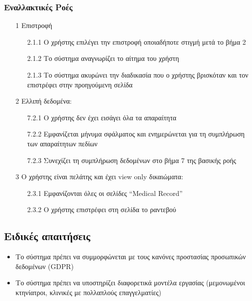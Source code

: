 \documentclass[12pt,a4paper,twoside]{book}
\begin{document}
\subsubsection{Εναλλακτικές Ροές}
\begin{enumerate}
  \item[1 ] Επιστροφή
        \begin{enumerate}
          \item[2.1.1 ] Ο χρήστης επιλέγει την επιστροφή οποιαδήποτε στιγμή μετά το βήμα 2 %
          \item[2.1.2 ] Το σύστημα αναγνωρίζει το αίτημα του χρήστη %
          \item[2.1.3 ] Το σύστημα ακυρώνει την διαδικασία που ο χρήστης βρισκόταν και τον επιστρέφει στην προηγούμενη σελίδα %
        \end{enumerate}
  \item[2 ] Ελλιπή δεδομένα:  %
        \begin{enumerate}
          \item[7.2.1 ] Ο χρήστης δεν έχει εισάγει όλα τα απαραίτητα  %
          \item[7.2.2 ] Εμφανίζεται μήνυμα σφάλματος και ενημερώνεται για τη συμπλήρωση των απαραίτητων πεδίων %
          \item[7.2.3 ] Συνεχίζει τη συμπλήρωση δεδομένων στο βήμα 7 της βασικής ροής %
        \end{enumerate}
  \item[3 ] Ο χρήστης είναι πελάτης και έχει view only δικαιώματα:  %
        \begin{enumerate}
          \item[2.3.1 ] Εμφανίζονται όλες οι σελίδες “Medical Record” %
          \item[2.3.2 ] Ο χρήστης επιστρέφει στη σελίδα το ραντεβού  %
        \end{enumerate}
\end{enumerate}

\subsection{Ειδικές απαιτήσεις} %
\begin{itemize}
  \item Το σύστημα πρέπει να συμμορφώνεται με τους κανόνες προστασίας προσωπικών δεδομένων (GDPR)  %
  \item Το σύστημα πρέπει να υποστηρίζει διαφορετικά μοντέλα εργασίας (μεμονωμένοι κτηνίατροι, κλινικές με πολλαπλούς επαγγελματίες)  %
\end{itemize}
\end{document}
